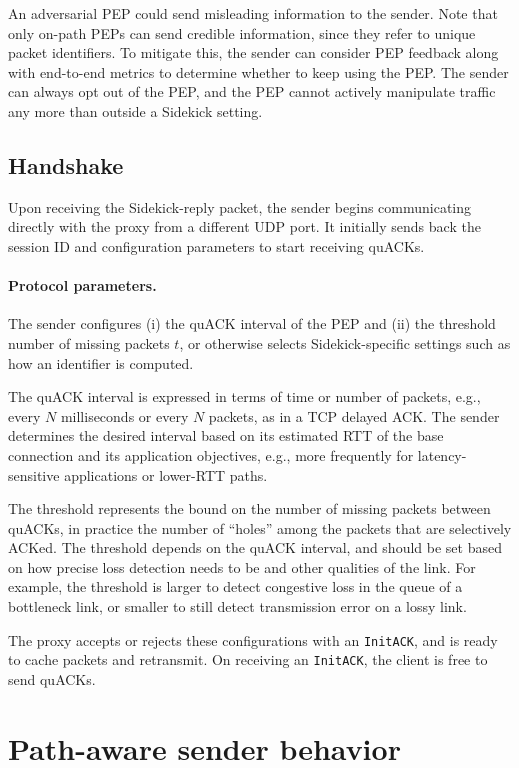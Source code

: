 An adversarial PEP could send misleading information to the sender. Note that
only on-path PEPs can send credible information, since they refer to unique
packet identifiers.
To mitigate this, the sender can consider PEP feedback along with
end-to-end metrics to determine whether to keep using the PEP. The sender can
always opt out of the PEP, and the PEP cannot actively manipulate traffic any
more than outside a Sidekick setting.

\subsection{Handshake}
\label{sec:sidekick:init:handshake}

Upon receiving the Sidekick-reply packet, the sender begins communicating
directly with the proxy from a different UDP port.  It initially sends
back the session ID and configuration parameters to start receiving
quACKs.

\paragraph{Protocol parameters.}
The sender configures (i) the quACK interval of the PEP and (ii) the threshold
number of missing packets $t$, or otherwise selects Sidekick-specific settings
such as how an identifier is computed.

The quACK interval is expressed in terms of time or number of packets,
 e.g., every $N$ milliseconds or every $N$ packets, as in a TCP delayed ACK.
The sender determines the desired interval based on its estimated
RTT of the base connection and its application objectives, e.g.,
more frequently for latency-sensitive applications or lower-RTT paths.

The threshold represents the bound on the number of missing packets
between quACKs, in practice the number of ``holes'' among the packets that are
selectively ACKed. The threshold depends on the quACK interval, and
should be set based on how precise loss detection needs to be and
other qualities of the link.
For example, the threshold is larger to detect congestive loss in the queue of a
bottleneck link, or smaller to still detect transmission error on a lossy link.

The proxy accepts or rejects these configurations with an \texttt{InitACK}, and
is ready to cache packets and retransmit. On receiving an \texttt{InitACK}, the
client is free to send quACKs.

\section{Path-aware sender behavior}
\label{sec:sidekick:sender}

